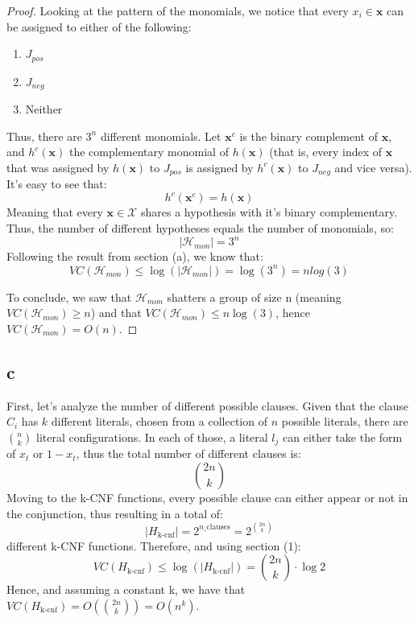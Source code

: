 \begin{proof}
    Looking at the pattern of the monomials, we notice that every $x_i \in \boldsymbol{x}$ can be assigned to either of the following:
    \begin{enumerate}
        \item $J_{pos}$
        \item $J_{neg}$
        \item Neither
    \end{enumerate}
    Thus, there are $3^n$ different monomials. 
    Let $\boldsymbol{x}^c$ is the binary complement of $\boldsymbol{x}$, and $h^c(\boldsymbol{x})$ the complementary monomial of $h(\boldsymbol{x})$ (that is, every index of $\boldsymbol{x}$ that was assigned by $h(\boldsymbol{x})$ to $J_{pos}$ is assigned by $h^c(\boldsymbol{x})$ to $J_{neg}$ and vice versa).
    It's easy to see that:
    \begin{equation*}
        h^c(\boldsymbol{x}^c) = h(\boldsymbol{x})
    \end{equation*}
    Meaning that every $\boldsymbol{x} \in \mathcal{X}$ shares a hypothesis with it's binary complementary. Thus, the number of different hypotheses equals the number of monomials, so:
    \begin{equation*}
        |\mathcal{H}_{mon}| = 3^n
    \end{equation*}
    Following the result from section (a), we know that:
    \begin{equation*}
        VC(\mathcal{H}_{mon}) \leq \log(|\mathcal{H}_{mon}|) = \log(3^n) = n log(3)
    \end{equation*}
    
    To conclude, we saw that $\mathcal{H}_{mon}$ shatters a group of size n (meaning $VC(\mathcal{H}_{mon}) \geq n$) and that $VC(\mathcal{H}_{mon}) \leq n\log(3)$, hence $VC(\mathcal{H}_{mon}) = O(n)$.
\end{proof}

\subsection*{c}
First, let's analyze the number of different possible clauses. Given that the clause $C_i$ has $k$ different literals, chosen from a collection of $n$ possible literals, there are $n \choose k$ literal configurations. In each of those, a literal $l_j$ can either take the form of $x_t$ or $1-x_t$, thus the total number of different clauses is:
\begin{equation*}
    {2n \choose k}
\end{equation*}
Moving to the k-CNF functions, every possible clause can either appear or not in the conjunction, thus resulting in a total of:
\begin{equation*}
    |H_{\text{k-cnf}}| = 2^{n\_{\text{clauses}}} = 2^{2n \choose k}
\end{equation*}
different k-CNF functions. Therefore, and using section (1):
\begin{equation*}
    VC(H_{\text{k-cnf}}) \leq \log(|H_{\text{k-cnf}}|) = {2n \choose k} \cdot \log 2
\end{equation*}
Hence, and assuming a constant k, we have that $VC(H_{\text{k-cnf}}) = O({2n \choose k}) = O(n^k)$.
